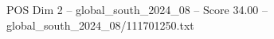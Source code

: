 \begin{textsample}{POS Dim 2 – global\_south\_2024\_08 – Score 34.00 – global\_south\_2024\_08/111701250.txt}
\end{textsample}
